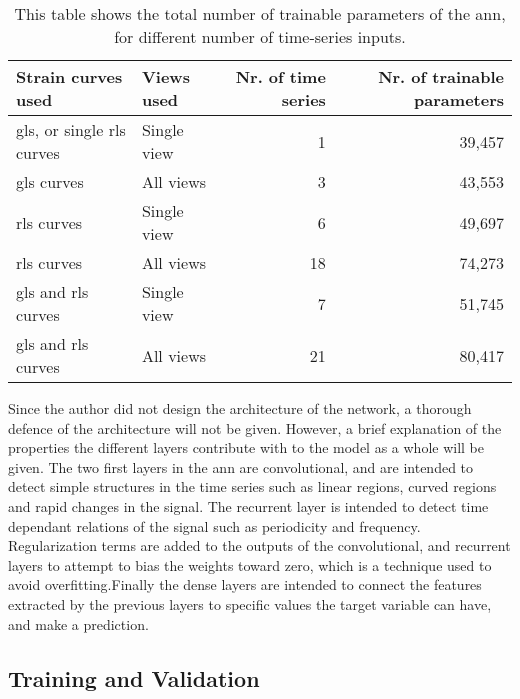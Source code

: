 \begin{table*}
    \centering
    \begin{tabular}{ llrr }
        \toprule
        Strain curves used                              & Views used  & Nr. of time series & Nr. of trainable parameters \\
        \midrule                                     
        \acrshort{gls}, or single \acrshort{rls} curves & Single view &         1          & 39,457 \\
        \acrshort{gls} curves                           &  All views  &         3          & 43,553 \\
        \acrshort{rls} curves                           & Single view &         6          & 49,697 \\
        \acrshort{rls} curves                           &  All views  &        18          & 74,273 \\
        \acrshort{gls} and \acrshort{rls} curves        & Single view &         7          & 51,745 \\
        \acrshort{gls} and \acrshort{rls} curves        &  All views  &        21          & 80,417 \\
        \bottomrule
    \end{tabular}
    \caption{This table shows the total number of trainable parameters of the \acrshort{ann}, for different number of time-series inputs.}
    \label{tab:train_params}
\end{table*}

Since the author did not design the architecture of the network, a thorough defence of the architecture will not be given. However, a brief explanation of the properties the different layers contribute with to the model as a whole will be given. The two first layers in the \acrshort{ann} are convolutional, and are intended to detect simple structures in the time series such as linear regions, curved regions and rapid changes in the signal. The recurrent layer is intended to detect time dependant relations of the signal such as periodicity and frequency. Regularization terms are added to the outputs of the convolutional, and recurrent layers to attempt to bias the weights toward zero, which is a technique used to avoid overfitting.Finally the dense layers are intended to connect the features extracted by the previous layers to specific values the target variable can have, and make a prediction.

\subsection{Training and Validation}

